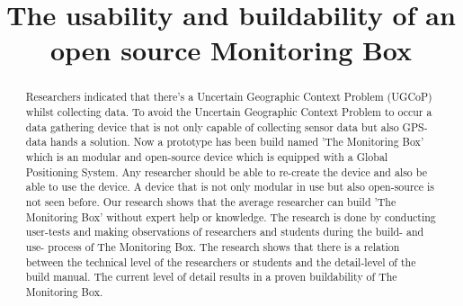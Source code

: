 \documentclass[conference]{IEEEtran}
\begin{document}
\title{The usability and buildability of an open source Monitoring Box}

\author{
	\and
		\and
		}
		
\maketitle	
\thispagestyle{plain}
\pagestyle{plain}

\begin{abstract}
Researchers indicated that there's a Uncertain Geographic Context Problem (UGCoP) \cite{kwan2012uncertain} whilst collecting data. To avoid the Uncertain Geographic Context Problem to occur a data gathering device that is not only capable of collecting sensor data but also GPS-data hands a solution. Now a prototype has been build named 'The Monitoring Box' which is an modular and open-source device which is equipped with a Global Positioning System. Any researcher should be able to re-create the device and also be able to use the device. A device that is not only modular in use but also open-source is not seen before. Our research shows that the average researcher can build 'The Monitoring Box' without expert help or knowledge. The research is done by conducting user-tests and making observations of researchers and students during the build- and use- process of The Monitoring Box. The research shows that there is a relation between the technical level of the researchers or students and the detail-level of the build manual. The current level of detail results in a proven buildability of The Monitoring Box.\\


\end{abstract}
\end{document}
